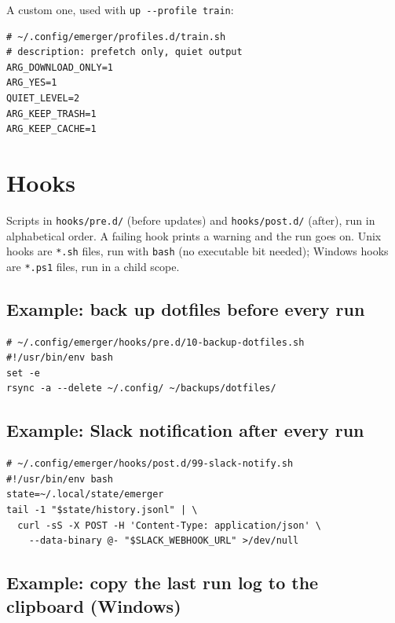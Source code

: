 \documentclass[11pt,a4paper]{article}
\begin{document}
A custom one, used with \texttt{up -{}-profile train}:

\begin{lstlisting}[language=bashplus]
# ~/.config/emerger/profiles.d/train.sh
# description: prefetch only, quiet output
ARG_DOWNLOAD_ONLY=1
ARG_YES=1
QUIET_LEVEL=2
ARG_KEEP_TRASH=1
ARG_KEEP_CACHE=1
\end{lstlisting}

\section{Hooks}\label{sec:hooks}

Scripts in \texttt{hooks/pre.d/} (before updates) and
\texttt{hooks/post.d/} (after), run in alphabetical order. A failing hook
prints a warning and the run goes on. Unix hooks are \texttt{*.sh} files,
run with \texttt{bash} (no executable bit needed); Windows hooks are
\texttt{*.ps1} files, run in a child scope.

\subsection{Example: back up dotfiles before every run}

\begin{lstlisting}[language=bashplus]
# ~/.config/emerger/hooks/pre.d/10-backup-dotfiles.sh
#!/usr/bin/env bash
set -e
rsync -a --delete ~/.config/ ~/backups/dotfiles/
\end{lstlisting}

\subsection{Example: Slack notification after every run}

\begin{lstlisting}[language=bashplus]
# ~/.config/emerger/hooks/post.d/99-slack-notify.sh
#!/usr/bin/env bash
state=~/.local/state/emerger
tail -1 "$state/history.jsonl" | \
  curl -sS -X POST -H 'Content-Type: application/json' \
    --data-binary @- "$SLACK_WEBHOOK_URL" >/dev/null
\end{lstlisting}

\subsection{Example: copy the last run log to the clipboard (Windows)}
\end{document}
